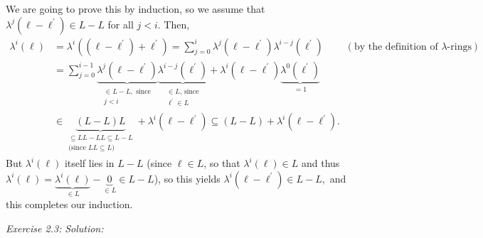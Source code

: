 \documentclass[numbers=enddot,12pt,final,onecolumn,notitlepage]{scrartcl}%
\begin{document}
We are going to prove this by induction, so we assume that $\lambda^{j}\left(
\ell-\ell^{\prime}\right)  \in L-L$ for all $j<i$. Then,%
\begin{align*}
\lambda^{i}\left(  \ell\right)   &  =\lambda^{i}\left(  \left(  \ell
-\ell^{\prime}\right)  +\ell^{\prime}\right)  =\sum_{j=0}^{i}\lambda
^{j}\left(  \ell-\ell^{\prime}\right)  \lambda^{i-j}\left(  \ell^{\prime
}\right)  \ \ \ \ \ \ \ \ \ \ \left(  \text{by the definition of }%
\lambda\text{-rings}\right) \\
&  =\sum_{j=0}^{i-1}\underbrace{\lambda^{j}\left(  \ell-\ell^{\prime}\right)
}_{\substack{\in L-L,\text{ since}\\j<i}}\underbrace{\lambda^{i-j}\left(
\ell^{\prime}\right)  }_{\substack{\in L\text{, since}\\\ell^{\prime}\in
L}}+\lambda^{i}\left(  \ell-\ell^{\prime}\right)  \underbrace{\lambda
^{0}\left(  \ell^{\prime}\right)  }_{=1}\\
&  \in\underbrace{\left(  L-L\right)  L}_{\substack{\subseteq LL-LL\subseteq
L-L\\\text{(since }LL\subseteq L\text{)}}}+\lambda^{i}\left(  \ell
-\ell^{\prime}\right)  \subseteq\left(  L-L\right)  +\lambda^{i}\left(
\ell-\ell^{\prime}\right)  .
\end{align*}
But $\lambda^{i}\left(  \ell\right)  $ itself lies in $L-L$ (since $\ell\in
L$, so that $\lambda^{i}\left(  \ell\right)  \in L$ and thus $\lambda
^{i}\left(  \ell\right)  =\underbrace{\lambda^{i}\left(  \ell\right)  }_{\in
L}-\underbrace{0}_{\in L}\in L-L$), so this yields $\lambda^{i}\left(
\ell-\ell^{\prime}\right)  \in L-L,$ and this completes our induction.

\textit{Exercise 2.3:} \textit{Solution:}
\end{document}
